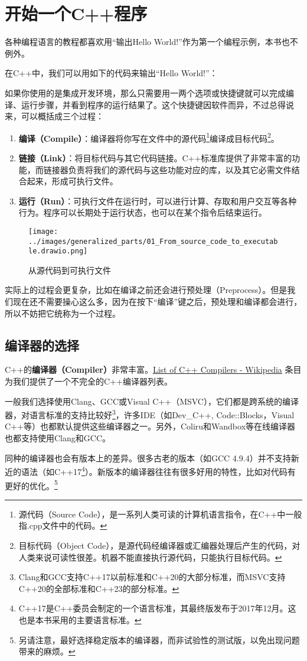 \section{开始一个C++程序}
各种编程语言的教程都喜欢用``输出Hello World!''作为第一个编程示例，本书也不例外。\par
在C++中，我们可以用如下的代码来输出``Hello World!''：
\par
如果你使用的是集成开发环境，那么只需要用一两个选项或快捷键就可以完成编译、运行步骤，并看到程序的运行结果了。这个快捷键因软件而异，不过总得说来，可以概括成三个过程：
\begin{enumerate}
    \item \textbf{编译（Compile）}：编译器将你写在文件中的源代码\footnote{源代码（Source Code），是一系列人类可读的计算机语言指令，在C++中一般指.cpp文件中的代码。}编译成目标代码\footnote{目标代码（Object Code），是源代码经编译器或汇编器处理后产生的代码，对人类来说可读性很差。机器不能直接执行源代码，只能执行目标代码。}。
    \item \textbf{链接（Link）}：将目标代码与其它代码链接。C++标准库提供了非常丰富的功能，而链接器负责将我们的源代码与这些功能对应的库，以及其它必需文件结合起来，形成可执行文件。
    \item \textbf{运行（Run）}：可执行文件在运行时，可以进行计算、存取和用户交互等各种行为。程序可以长期处于运行状态，也可以在某个指令后结束运行。
\end{enumerate}
\begin{figure}[htbp]
    \centering
    \texttt{[image: ../images/generalized\_parts/01\_From\_source\_code\_to\_executable.drawio.png]}
    \caption{从源代码到可执行文件}
\end{figure}
实际上的过程会更复杂，比如在编译之前还会进行预处理（Preprocess）。但是我们现在还不需要操心这么多，因为在按下``编译''键之后，预处理和编译都会进行，所以不妨把它统称为一个过程。\par
\subsection*{编译器的选择}
C++的\textbf{编译器（Compiler）}非常丰富。\href{https://en.wikipedia.org/wiki/List_of_compilers\#C++_compilers}{List of C++ Compilers - Wikipedia} 条目为我们提供了一个不完全的C++编译器列表。\par
一般我们选择使用Clang、GCC或Visual C++（MSVC），它们都是跨系统的编译器，对语言标准的支持比较好\footnote{Clang和GCC支持C++17以前标准和C++20的大部分标准，而MSVC支持C++20的全部标准和C++23的部分标准。}，许多IDE（如Dev\_C++, Code::Blocks，Visual C++等）也都默认提供这些编译器之一。另外，Coliru和Wandbox等在线编译器也都支持使用Clang和GCC。\par
同种的编译器也会有版本上的差异。很多古老的版本（如GCC 4.9.4）并不支持新近的语法（如C++17\footnote{C++17是C++委员会制定的一个语言标准，其最终版发布于2017年12月。这也是本书采用的主要语言标准。}）。新版本的编译器往往有很多好用的特性，比如对代码有更好的优化。\footnote{另请注意，最好选择稳定版本的编译器，而非试验性的测试版，以免出现问题带来的麻烦。}\par
